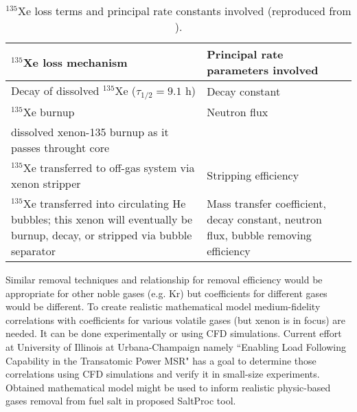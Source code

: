 \begin{table}[ht!]
\caption{$^{135}$Xe loss terms and principal rate constants involved
 (reproduced from \cite{kedl_development_1967}).}
  \centering
\begin{tabularx}{\textwidth}{b | b}
\hline \textbf{$^{135}$Xe loss mechanism}      & \textbf{Principal rate 
parameters involved}  	\\
\hline Decay of dissolved $^{135}$Xe ($\tau_{1/2}=9.1$ h)  & Decay constant							\\
\hline $^{135}$Xe burnup              &  Neutron flux		 					\\
dissolved xenon-135 burnup as it passes throught core  & 			            \\		\hline $^{135}$Xe transferred to off-gas system via xenon stripper & Stripping efficiency		\\
\hline $^{135}$Xe transferred into circulating He bubbles; this xenon will eventually be burnup, decay, or stripped via bubble separator & Mass transfer coefficient, decay constant, neutron flux, bubble removing efficiency		\\
\hline 
\end{tabularx}
  		\label{tab:xe_loss}
\end{table}

Similar removal techniques and relationship for removal efficiency would be 
appropriate 
for other noble gases (e.g. Kr) but coefficients for different gases would be 
different. To create realistic mathematical model medium-fidelity correlations with 
coefficients for various volatile gases (but xenon is in focus) are needed. It can be 
done experimentally or using CFD simulations. Current effort at University of 
 Illinois at Urbana-Champaign namely ``Enabling Load Following Capability in the 
Transatomic Power MSR" \cite{huff_enabling_2018} has a goal to determine those 
correlations using CFD simulations 
and verify it in small-size experiments. Obtained mathematical model might be used 
to inform realistic physic-based gases removal from fuel salt in proposed SaltProc 
tool.

